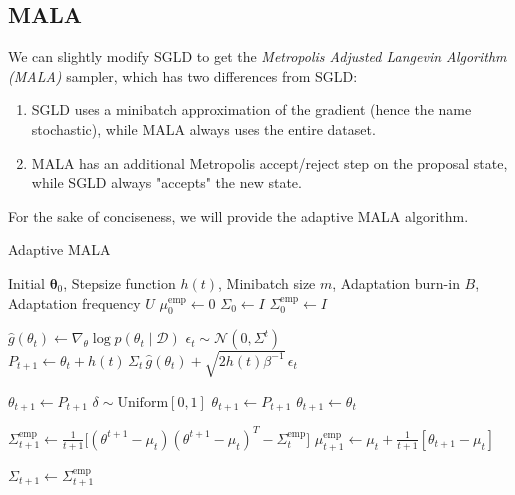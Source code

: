   \subsection{MALA}

    We can slightly modify SGLD to get the \textit{Metropolis Adjusted Langevin Algorithm (MALA)} sampler, which has two differences from SGLD: 
    \begin{enumerate}
      \item SGLD uses a minibatch approximation of the gradient (hence the name stochastic), while MALA always uses the entire dataset.
      \item MALA has an additional Metropolis accept/reject step on the proposal state, while SGLD always "accepts" the new state.
    \end{enumerate}
    For the sake of conciseness, we will provide the adaptive MALA algorithm. 

    \begin{algorithm}
      \caption{Adaptive MALA}\label{alg:adaptive_mala}
      \begin{algorithmic}

      \Require Initial $\boldsymbol{\theta}_0$, Stepsize function $h(t)$, Minibatch size $m$, Adaptation burn-in $B$, Adaptation frequency $U$
      \State $\mu_0^{\mathrm{emp}} \gets 0$
      \State $\Sigma_0 \gets I$
      \State $\Sigma_0^{\mathrm{emp}} \gets I$

          \State $\hat{g}(\theta_t) \gets \nabla_\theta \log{p(\theta_t \mid \mathcal{D})}$
          \State $\epsilon_t \sim \mathcal{N}(0, \Sigma^t)$
          \State $P_{t+1} \gets \theta_t + h(t) \, \Sigma_t \, \hat{g}(\theta_t) + \sqrt{2 h(t) \beta^{-1}} \, \epsilon_t$ 
          
              \State $\theta_{t+1} \gets P_{t+1}$
          \Else 
              \State $\delta \sim \mathrm{Uniform}[0, 1]$ 
                  \State $\theta_{t+1} \gets P_{t+1}$ 
              \Else 
                  \State $\theta_{t+1} \gets \theta_t$
              \EndIf
          \EndIf
          
          \State $\Sigma^\mathrm{emp}_{t+1} \gets \frac{1}{t+1} \big[(\theta^{t+1} - \mu_t) (\theta^{t+1} - \mu_t)^T - \Sigma^\mathrm{emp}_t \big]$
          \State $\mu_{t+1}^\mathrm{emp} \gets \mu_t + \frac{1}{t+1} [ \theta_{t+1} - \mu_t ]$
          
              \State $\Sigma_{t+1} \gets \Sigma_{t+1}^{\mathrm{emp}}$
          \EndIf
      \EndFor

      \end{algorithmic}
    \end{algorithm}

